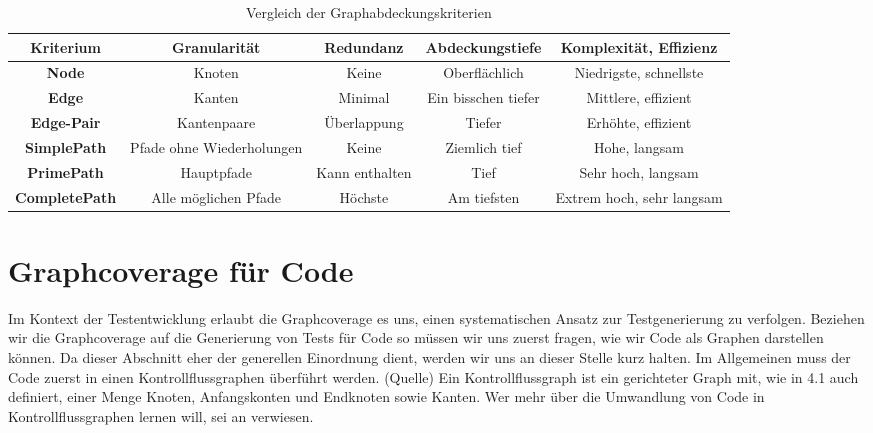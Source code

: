 \begin{center}
    \begin{table}[!ht]
        \begin{tabularx}{\textwidth}{|c|c|c|c|c|}
            \hline
            \textbf{Kriterium} & \textbf{Granularität} & \textbf{Redundanz} & \textbf{Abdeckungstiefe} & \textbf{Komplexität, Effizienz}\\
            \hline
            \textbf{Node} & Knoten & Keine & Oberflächlich & Niedrigste, schnellste\\
            \hline
            \textbf{Edge} & Kanten & Minimal & Ein bisschen tiefer & Mittlere, effizient\\
            \hline
            \textbf{Edge-Pair} & Kantenpaare & Überlappung & Tiefer & Erhöhte, effizient\\
            \hline
            \textbf{SimplePath} & Pfade ohne Wiederholungen & Keine & Ziemlich tief & Hohe, langsam\\
            \hline
            \textbf{PrimePath} & Hauptpfade & Kann enthalten & Tief & Sehr hoch, langsam\\
            \hline
            \textbf{CompletePath} & Alle möglichen Pfade & Höchste & Am tiefsten & Extrem hoch, sehr langsam\\
            \hline
        \end{tabularx}
        \caption{Vergleich der Graphabdeckungskriterien}
    \end{table}
\end{center}

\section{Graphcoverage für Code}

Im Kontext der Testentwicklung erlaubt die Graphcoverage es uns, einen systematischen Ansatz zur Testgenerierung zu verfolgen.
Beziehen wir die Graphcoverage auf die Generierung von Tests für Code so müssen wir uns zuerst fragen, wie wir Code
als Graphen darstellen können.
Da dieser Abschnitt eher der generellen Einordnung dient, werden wir uns an dieser Stelle kurz halten.
Im Allgemeinen muss der Code zuerst in einen Kontrollflussgraphen überführt werden. (Quelle)
Ein Kontrollflussgraph ist ein gerichteter Graph mit, wie in 4.1 auch definiert, einer Menge Knoten, Anfangskonten und Endknoten sowie Kanten.
Wer mehr über die Umwandlung von Code in Kontrollflussgraphen lernen will, sei an \cite[Kapitel 2.]{software-testing} verwiesen.


